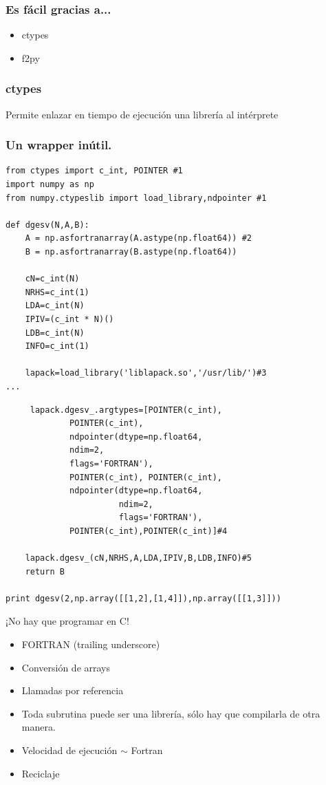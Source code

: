 \documentclass{beamer}
\begin{document}
\begin{frame}
 \frametitle{Es fácil gracias a...}
\begin{itemize}
 \item ctypes
 \item f2py
\end{itemize}

\end{frame}

\begin{frame}
 \frametitle{ctypes}
Permite enlazar en tiempo de ejecución una librería al intérprete
\end{frame}

\begin{frame}[containsverbatim]
 \frametitle{Un wrapper inútil.}
\begin{verbatim}
from ctypes import c_int, POINTER #1
import numpy as np
from numpy.ctypeslib import load_library,ndpointer #1

def dgesv(N,A,B):
    A = np.asfortranarray(A.astype(np.float64)) #2
    B = np.asfortranarray(B.astype(np.float64))

    cN=c_int(N)
    NRHS=c_int(1)
    LDA=c_int(N)
    IPIV=(c_int * N)()
    LDB=c_int(N)
    INFO=c_int(1)

    lapack=load_library('liblapack.so','/usr/lib/')#3
...
\end{verbatim}
\end{frame}

\begin{frame}[containsverbatim]
 \begin{verbatim}
     lapack.dgesv_.argtypes=[POINTER(c_int),
             POINTER(c_int),
             ndpointer(dtype=np.float64,
             ndim=2,
             flags='FORTRAN'),
             POINTER(c_int), POINTER(c_int),
             ndpointer(dtype=np.float64,
                       ndim=2,
                       flags='FORTRAN'),
             POINTER(c_int),POINTER(c_int)]#4

    lapack.dgesv_(cN,NRHS,A,LDA,IPIV,B,LDB,INFO)#5
    return B

print dgesv(2,np.array([[1,2],[1,4]]),np.array([[1,3]]))
\end{verbatim}
\end{frame}

\begin{frame}
 \begin{center}
  \begin{huge}
   ¡No hay que programar en C!
  \end{huge}
 \end{center}
\vspace{2cm}
\begin{itemize}
 \item FORTRAN (trailing underscore)
 \item Conversión de arrays
 \item Llamadas por referencia
 \item Toda subrutina puede ser una librería, sólo hay que compilarla de otra manera.
 \item Velocidad de ejecución $\sim$ Fortran
 \item Reciclaje
\end{itemize}
\end{frame}
\end{document}
